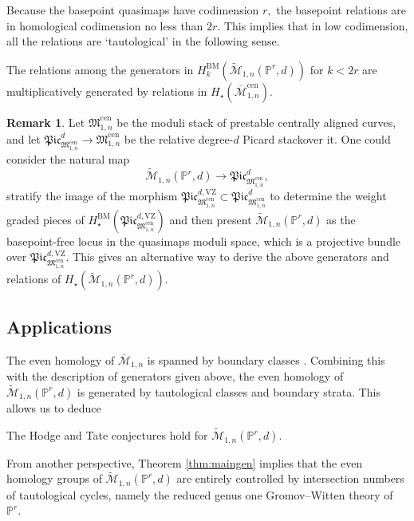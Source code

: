 \documentclass[12pt,reqno]{amsart}
\theoremstyle{definition}
\theoremstyle{definition}
\newenvironment{customcor}[1]
  {\renewcommand\theinnercustomcor{#1}\innercustomcor}
  {\endinnercustomcor}
\theoremstyle{definition}
\theoremstyle{definition}
\newtheorem{remark}[theorem]{Remark}
\newcommand{\ol}[1]{\overline{#1}}
\newcommand{\PP}{\mathbb{P}}
\newcommand{\Mcal}{\mathcal{M}}
\newcommand{\Mbar}{\ol{\Mcal}}
\newcommand{\Mtil}{\widetilde{\mathcal{M}}}
\begin{document}
Because the basepoint quasimaps have codimension $r,$ the basepoint relations are in homological codimension no less than $2r.$ This implies that in low codimension, all the relations are `tautological' in the following sense.

\begin{customcor}{C}
  The relations among the generators in $H_{k}^{\mathrm{BM}}(\Mtil_{1,n}(\PP^r,d))$ for $k<2r$ are multiplicatively generated by relations in $H_{\star}(\Mbar_{1,n}^{\mathrm{cen}}).$
\end{customcor}

\begin{remark}
  Let $\mathfrak{M}_{1,n}^{\mathrm{cen}}$ be the moduli stack of prestable centrally aligned curves, and let $\mathfrak{Pic}_{{\mathfrak{M}}_{1,n}^{\mathrm{cen}}}^d\to \mathfrak{M}_{1,n}^{\mathrm{cen}}$ be the relative degree-$d$ Picard stackover it. One could consider the natural map $$\Mtil_{1,n}(\PP^r,d)\to \mathfrak{Pic}_{{\mathfrak{M}}_{1,n}^{\mathrm{cen}}}^d,$$ stratify the image of the morphism $\mathfrak{Pic}_{{\mathfrak{M}}_{1,n}^{\mathrm{cen}}}^{d, \mathrm{VZ}}\subset \mathfrak{Pic}_{{\mathfrak{M}}_{1,n}^{\mathrm{cen}}}^d$ to determine the weight graded pieces of $H_\star^{\mathrm{BM}}(\mathfrak{Pic}_{{\mathfrak{M}}_{1,n}^{\mathrm{cen}}}^{d, \mathrm{VZ}})$ and then present $\Mtil_{1,n}(\PP^r,d)$ as the basepoint-free locus in the quasimaps moduli space, which is a projective bundle over $\mathfrak{Pic}_{{\mathfrak{M}}_{1,n}^{\mathrm{cen}}}^{d, \mathrm{VZ}}.$ This gives an alternative way to derive the above generators and relations of $H_\star(\Mtil_{1,n}(\PP^r,d)).$
\end{remark}

\subsection{Applications}
The even homology of $\Mbar_{1,n}$ is spanned by boundary classes \cite{pet}. Combining this with the description of generators given above, the even homology of $\Mtil_{1,n}(\mathbb{P}^r,d)$ is generated by tautological classes and boundary strata. This allows us to deduce

\begin{customcor}{D}[Corollary \ref{cor:HT}]
  The Hodge and Tate conjectures hold for $\Mtil_{1,n}(\PP^r,d).$
\end{customcor}

From another perspective, Theorem \ref{thm:maingen} implies that the even homology groups of $\Mtil_{1,n}(\PP^r,d)$ are entirely controlled by intersection numbers of tautological cycles, namely the reduced genus one Gromov--Witten theory of $\PP^r.$ 
\end{document}
